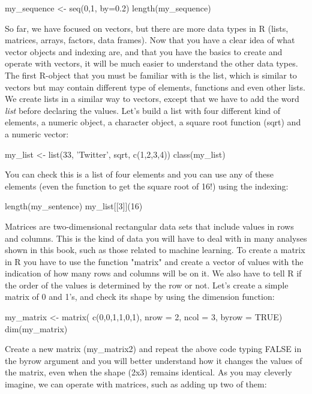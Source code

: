 \begin{exampler}
my_sequence <- seq(0,1, by=0.2)
length(my_sequence)
\end{exampler}

So far, we have focused on vectors, but there are more data types in R (lists, matrices, arrays, factors, data frames). Now that you have a clear idea of what vector objects and indexing are, and that you have the basics to create and operate with vectors, it will be much easier to understand the other data types. The first R-object that you must be familiar with is the list, which is similar to vectors but may contain different type of elements, functions and even other lists. We create lists in a similar way to vectors, except that we have to add the word \emph{list} before declaring the values. Let's build a list with four different kind of elements, a numeric object, a character object, a square root function (sqrt) and a numeric vector:

\begin{exampler}
my_list <- list(33, 'Twitter', sqrt, c(1,2,3,4))
class(my_list)
\end{exampler}

You can check this is a list of four elements and you can use any of these elements (even the function to get the square root of 16!) using the indexing:

\begin{exampler}
length(my_sentence)
my_list[[3]](16)
\end{exampler}

Matrices are two-dimensional rectangular data sets that include values in rows and columns. This is the kind of data you will have to deal with in many analyses shown in this book, such as those related to machine learning.  To create a matrix in R you have to use the function "matrix" and create a vector of values with the indication of how many rows and columns will be on it. We also have to tell R if the order of the values is determined by the row or not.  Let’s create a simple matrix of 0 and 1’s, and check its shape by using the dimension function:

\begin{exampler}
my_matrix <- matrix( c(0,0,1,1,0,1), nrow = 2, ncol = 3, byrow = TRUE)
dim(my_matrix)
\end{exampler}

Create a new matrix (my\_matrix2) and repeat the above code typing FALSE in the byrow argument and you will better understand how it changes the values of the matrix, even when the shape (2x3) remains identical. As you may cleverly imagine, we can operate with matrices, such as adding up two of them:

